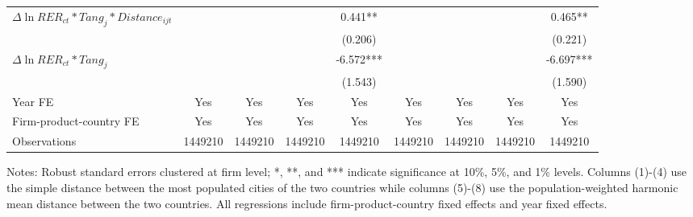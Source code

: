 \begin{table}
{\begin{threeparttable}
\begin{tabular}{lcccccccc}
				$\Delta \ln RER_{ct}*Tang_{j}*Distance_{ijt}$ &     &       &       & 0.441** &       &       &       & 0.465** \\
				&    &       &       & (0.206) &       &       &       & (0.221) \\
				$\Delta \ln RER_{ct}*Tang_{j}$ &    &       &       & -6.572*** &       &       &       & -6.697*** \\
				&     &       &       & (1.543) &       &       &       & (1.590) \\
				Year FE  & Yes   & Yes   & Yes   & Yes & Yes   & Yes   & Yes   & Yes\\
				Firm-product-country FE & Yes   & Yes   & Yes   & Yes & Yes   & Yes   & Yes   & Yes\\
				Observations & 1449210 & 1449210 & 1449210 & 1449210 & 1449210 & 1449210 & 1449210 & 1449210\\
				\bottomrule
			\end{tabular}
			\begin{tablenotes}
				\footnotesize
				\item[Notes:]Robust standard errors clustered at firm level; *, **, and *** indicate significance at 10\%, 5\%, and 1\% levels. Columns (1)-(4) use the simple distance between the most populated cities of the two countries while columns (5)-(8) use the population-weighted harmonic mean distance between the two countries. All regressions include firm-product-country fixed effects and year fixed effects.
			\end{tablenotes}
		\end{threeparttable}
	}
	\label{tab.source.distance}
\end{table}

